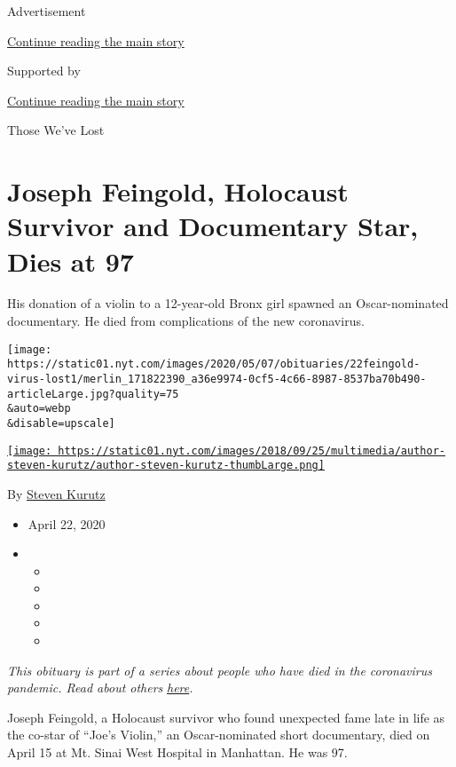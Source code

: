 Advertisement

\protect\hyperlink{after-top}{Continue reading the main story}

Supported by

\protect\hyperlink{after-sponsor}{Continue reading the main story}

Those We've Lost

\hypertarget{joseph-feingold-holocaust-survivor-and-documentary-star-dies-at-97}{%
\section{Joseph Feingold, Holocaust Survivor and Documentary Star, Dies
at
97}\label{joseph-feingold-holocaust-survivor-and-documentary-star-dies-at-97}}

His donation of a violin to a 12-year-old Bronx girl spawned an
Oscar-nominated documentary. He died from complications of the new
coronavirus.

\texttt{[image: https://static01.nyt.com/images/2020/05/07/obituaries/22feingold-virus-lost1/merlin\_171822390\_a36e9974-0cf5-4c66-8987-8537ba70b490-articleLarge.jpg?quality=75\\\&auto=webp\\\&disable=upscale]}

\href{https://www.nytimes.com/by/steven-kurutz}{\texttt{[image: https://static01.nyt.com/images/2018/09/25/multimedia/author-steven-kurutz/author-steven-kurutz-thumbLarge.png]}}

By \href{https://www.nytimes.com/by/steven-kurutz}{Steven Kurutz}

\begin{itemize}
\item
  April 22, 2020
\item
  \begin{itemize}
  \item
  \item
  \item
  \item
  \item
  \end{itemize}
\end{itemize}

\emph{This obituary is part of a series about people who have died in
the coronavirus pandemic. Read about others}
\href{https://www.nytimes.com/series/people-who-have-died-of-the-coronavirus}{\emph{here}}\emph{.}

Joseph Feingold, a Holocaust survivor who found unexpected fame late in
life as the co-star of ``Joe's Violin,'' an Oscar-nominated short
documentary, died on April 15 at Mt. Sinai West Hospital in Manhattan.
He was 97.

